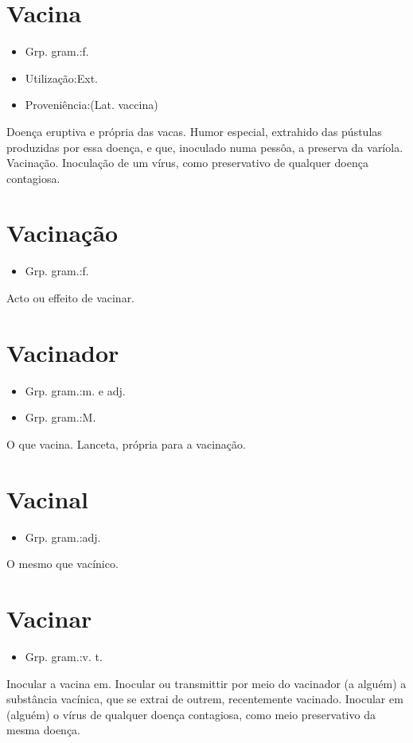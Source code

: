 \documentclass{article}
\begin{document}
\section{Vacina}
\begin{itemize}
\item {Grp. gram.:f.}
\end{itemize}
\begin{itemize}
\item {Utilização:Ext.}
\end{itemize}
\begin{itemize}
\item {Proveniência:(Lat. \textunderscore vaccina\textunderscore )}
\end{itemize}
Doença eruptiva e própria das vacas.
Humor especial, extrahido das pústulas produzidas por essa doença, e que, inoculado numa pessôa, a preserva da varíola.
Vacinação.
Inoculação de um vírus, como preservativo de qualquer doença contagiosa.
\section{Vacinação}
\begin{itemize}
\item {Grp. gram.:f.}
\end{itemize}
Acto ou effeito de vacinar.
\section{Vacinador}
\begin{itemize}
\item {Grp. gram.:m.  e  adj.}
\end{itemize}
\begin{itemize}
\item {Grp. gram.:M.}
\end{itemize}
O que vacina.
Lanceta, própria para a vacinação.
\section{Vacinal}
\begin{itemize}
\item {Grp. gram.:adj.}
\end{itemize}
O mesmo que \textunderscore vacínico\textunderscore .
\section{Vacinar}
\begin{itemize}
\item {Grp. gram.:v. t.}
\end{itemize}
Inocular a vacina em.
Inocular ou transmittir por meio do vacinador (a alguém) a substância vacínica, que se extrai de outrem, recentemente vacinado.
Inocular em (alguém) o vírus de qualquer doença contagiosa, como meio preservativo da mesma doença.
\end{document}
